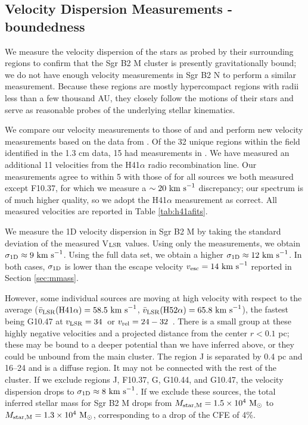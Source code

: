 \documentclass[twocolumn]{aastex62}
\begin{document}
\subsection{Velocity Dispersion Measurements - boundedness}
\label{sec:vdisp}
We measure the velocity dispersion of the stars as probed by their surrounding
\hii regions to confirm that the Sgr B2 M cluster is presently gravitationally
bound; we do not have enough velocity measurements in Sgr B2 N to perform a
similar measurement.
Because these regions are mostly hypercompact \hii regions with radii less than a few
thousand AU, they closely follow the motions of their stars and serve as reasonable
probes of the underlying stellar kinematics.

We compare our velocity measurements to those of \citet{De-Pree2011a} and
\citet{De-Pree1996a} and perform  new velocity measurements based on the
data from \citet{Ginsburg2018a}.  Of the 32 unique \hii regions within the field
identified in the \citet{Gaume1995a} 1.3 cm data, 
15 had measurements in \citet{De-Pree2011a}.  We have measured an additional 11
velocities from the H41$\alpha$ radio recombination line.  Our measurements
agree to within 5 \kms with those of \citet{De-Pree2011a} for all sources we
both measured except F10.37, for which we measure a $\sim20~\textrm{km~s}^{-1}$ discrepancy;
our spectrum is of much higher quality, so we adopt the H41$\alpha$ measurement
as correct.  All measured velocities are reported in Table \ref{tab:h41afits}.

We measure the 1D velocity dispersion in Sgr B2 M by taking the standard
deviation of the measured V$_{\rm LSR}$ values.  Using only the
\citet{De-Pree2011a} measurements, we obtain $\sigma_{\rm 1D}\approx9~\textrm{km~s}^{-1}$.  Using
the full data set, we obtain a higher $\sigma_{\rm 1D}\approx12~\textrm{km~s}^{-1}$.  In both
cases, $\sigma_{\rm 1D}$ is  lower than the escape velocity
$v_{\rm esc}=14~\textrm{km~s}^{-1}$ reported in Section \ref{sec:mmass}.

However, some individual sources are moving at high velocity with respect to
the average ($\bar{v}_{\rm LSR}(\rm H41\alpha) = 58.5~\textrm{km~s}^{-1}$, $\bar{v}_{\rm LSR}(\rm H52\alpha)
= 65.8~\textrm{km~s}^{-1}$), the fastest being G10.47 at $v_{\rm LSR}=34$~\kms or
$v_{\rm rel}=24-32$~\kms.  There is a small group at these highly negative
velocities and a projected distance from the center $r<0.1$ pc; these may be
bound to a deeper potential than we have inferred above, or they could be unbound
from the main cluster.
The \hii region J is separated by 0.4 pc and 16--24 \kms and is a diffuse \hii
region.  It may not be connected with the rest of the cluster.
If we exclude regions J, F10.37, G, G10.44, and G10.47, the velocity dispersion
drops to $\sigma_{\rm 1D}\approx8~\textrm{km~s}^{-1}$.  If we exclude these sources, the total
inferred stellar mass for Sgr B2 M drops from $M_{\rm star,M} = 1.5\times10^{4}~\mathrm{M}_{\odot}$ to
$M_{\rm star,M}=1.3\times10^{4}~\mathrm{M}_{\odot}$, corresponding to a drop of the CFE of 4\%.
\end{document}
